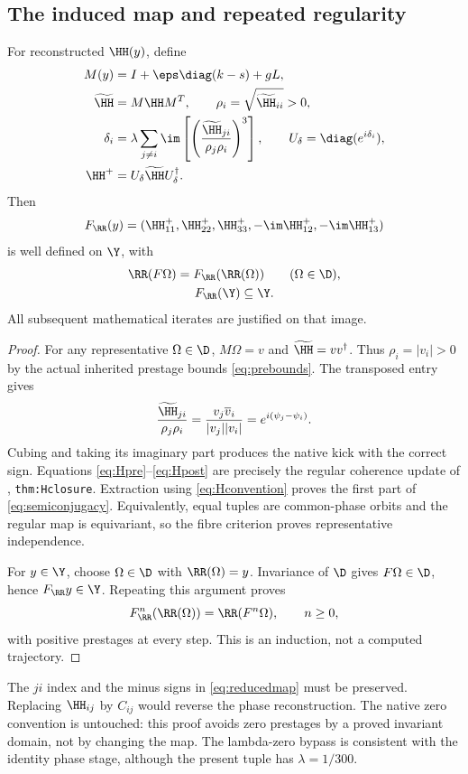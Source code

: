 \subsection{The induced map and repeated regularity}
\begin{theorem}\label{thm:autonomy}
For reconstructed \(\HH(y)\), define
\begin{align}
M(y)&=I+\eps\diag(k-s)+gL,\notag\\
\widetilde{\HH}&=M\HH M^T,\qquad
\rho_i=\sqrt{\widetilde{\HH}_{ii}}>0,\label{eq:Hpre}\\
\delta_i&=\lambda\sum_{j\ne i}\im\left[
\left(\frac{\widetilde{\HH}_{ji}}{\rho_j\rho_i}\right)^3\right],
\qquad U_\delta=\diag(e^{i\delta_i}),\notag\\
\HH^+&=U_\delta\widetilde{\HH}U_\delta^\dagger.
\label{eq:Hpost}
\end{align}
Then
\begin{equation}
F_{\RR}(y)=
(\HH^+_{11},\HH^+_{22},\HH^+_{33},
-\im\HH^+_{12},-\im\HH^+_{13})
\label{eq:reducedmap}
\end{equation}
is well defined on \(\Y\), with
\begin{gather}
\RR(F\Omega)=F_{\RR}(\RR(\Omega))\qquad(\Omega\in\D),\notag\\
F_{\RR}(\Y)\subseteq\Y.
\label{eq:semiconjugacy}
\end{gather}
All subsequent mathematical iterates are justified on that image.
\end{theorem}

\begin{proof}
For any representative \(\Omega\in\D\), \(M\Omega=v\) and
\(\widetilde{\HH}=vv^\dagger\). Thus \(\rho_i=|v_i|>0\) by the actual inherited prestage bounds \eqref{eq:prebounds}. The transposed entry gives
\[
\frac{\widetilde{\HH}_{ji}}{\rho_j\rho_i}
=\frac{v_j\overline v_i}{|v_j||v_i|}
=e^{i(\psi_j-\psi_i)}.
\]
Cubing and taking its imaginary part produces the native kick with the correct sign. Equations \eqref{eq:Hpre}--\eqref{eq:Hpost} are precisely the regular coherence update of \cite{nrg}, \texttt{thm:Hclosure}. Extraction using \eqref{eq:Hconvention} proves the first part of \eqref{eq:semiconjugacy}. Equivalently, equal tuples are common-phase orbits and the regular map is equivariant, so the fibre criterion proves representative independence.

For \(y\in\Y\), choose \(\Omega\in\D\) with \(\RR(\Omega)=y\). Invariance of \(\D\) gives \(F\Omega\in\D\), hence \(F_{\RR}y\in\Y\). Repeating this argument proves
\begin{equation}
F_{\RR}^{n}(\RR(\Omega))=\RR(F^n\Omega),\qquad n\ge0,
\label{eq:iterates}
\end{equation}
with positive prestages at every step. This is an induction, not a computed trajectory.
\end{proof}

The \(ji\) index and the minus signs in \eqref{eq:reducedmap} must be preserved. Replacing \(\HH_{ij}\) by \(C_{ij}\) would reverse the phase reconstruction. The native zero convention is untouched: this proof avoids zero prestages by a proved invariant domain, not by changing the map. The lambda-zero bypass is consistent with the identity phase stage, although the present tuple has \(\lambda=1/300\).
